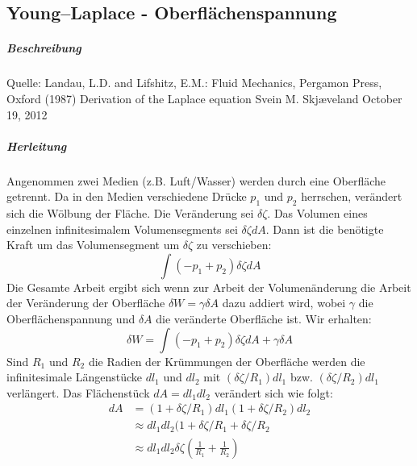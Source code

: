 \begin{refsection}
\subsection{Young–Laplace - Oberflächenspannung}\label{Young-Laplace}
\subparagraph{Beschreibung}\label{YL-Beschreibung}
Quelle: Landau, L.D. and Lifshitz, E.M.: Fluid Mechanics, Pergamon Press, Oxford
(1987) 
Derivation of the Laplace equation
Svein M. Skjæveland
October 19, 2012
\subparagraph{Herleitung}\label{YL-Herleitung}
Angenommen zwei Medien (z.B. Luft/Wasser) werden durch eine Oberfläche getrennt. Da in den Medien verschiedene Drücke $p_1$ und $p_2$ herrschen, verändert sich die Wölbung der Fläche. Die Veränderung sei $\delta \zeta$. Das Volumen eines einzelnen infinitesimalem Volumensegments sei $\delta \zeta dA$. Dann ist die benötigte Kraft um das Volumensegment um $\delta\zeta$ zu verschieben:
\begin{equation}
\int(-p_1+p_2)\delta \zeta dA
\end{equation}
Die Gesamte Arbeit ergibt sich wenn zur Arbeit der Volumenänderung die Arbeit der Veränderung der Oberfläche $\delta W=\gamma \delta A $ dazu addiert wird, wobei $\gamma$ die Oberflächenspannung und $\delta A$ die veränderte Oberfläche ist. Wir erhalten:
\begin{equation}\label{YL-Arbeit_1}
\delta W=\int(-p_1+p_2)\delta\zeta dA + \gamma\delta A
\end{equation}
Sind $R_1$ und $R_2$ die Radien der Krümmungen der Oberfläche werden die infinitesimale Längenstücke $dl_1$ und $dl_2$ mit $(\delta\zeta /R_1)dl_1$ bzw. $(\delta\zeta /R_2)dl_1$ verlängert. Das Flächenstück $dA=dl_1 dl_2$ verändert sich wie folgt:
\begin{equation}
\begin{split}
dA &= (1+\delta\zeta/R_1)dl_1 (1+\delta\zeta/R_2)dl_2 \\
&\approx dl_1 dl_2 (1+\delta\zeta/R_1 + \delta\zeta/R_2 \\
&\approx dl_1 dl_2 \delta\zeta (\frac{1}{R_1}+\frac{1}{R_2})
\end{split}
\end{equation} 
\begin{figure}[H]
  \centering

\end{figure}
\end{refsection}
